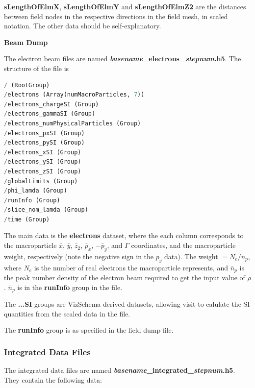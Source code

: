 \documentclass[12pt]{article}%
\begin{document}
{\bf sLengthOfElmX}, {\bf sLengthOfElmY} and {\bf sLengthOfElmZ2} are the distances between field nodes in the respective directions in the field mesh, in scaled notation. The other data should be self-explanatory.



{\bf Beam Dump}

The electron beam files are named {\bf \textit{basename}\_electrons\_\textit{stepnum}.h5}. The structure of the file is

\begin{lstlisting}[language=python]
/ (RootGroup)
/electrons (Array(numMacroParticles, 7))
/electrons_chargeSI (Group)
/electrons_gammaSI (Group)
/electrons_numPhysicalParticles (Group)
/electrons_pxSI (Group)
/electrons_pySI (Group)
/electrons_xSI (Group)
/electrons_ySI (Group)
/electrons_zSI (Group)
/globalLimits (Group)
/phi_lamda (Group)
/runInfo (Group)
/slice_nom_lamda (Group)
/time (Group)
\end{lstlisting}

The main data is the {\bf electrons} dataset, where the each column corresponds to the macroparticle $\bar{x}$, $\bar{y}$, $\bar{z}_2$, $\bar{p}_x$, $-\bar{p}_y$, and $\Gamma$ coordinates, and the macroparticle weight, respectively (note the negative sign in the $\bar{p}_y$ data). The weight $= N_e / \bar{n}_p$, where $N_e$ is the number of real electrons the macroparticle represents, and $\bar{n}_p$ is the peak number density of the electron beam required to get the input value of $\rho$. $\bar{n}_p$ is in the {\bf runInfo} group in the file.

The {\bf ...SI} groups are VizSchema derived datasets, allowing visit to calulate the SI quantities from the scaled data in the file.

The {\bf runInfo} group is as specified in the field dump file.

\subsubsection{Integrated Data Files}

The integrated data files are named {\bf \textit{basename}\_integrated\_\textit{stepnum}.h5}. They contain the following data:
\end{document}
